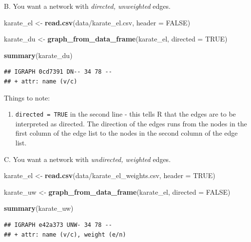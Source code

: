 \documentclass[
]{book}
\newenvironment{Shaded}{\begin{snugshade}}{\end{snugshade}}
\newcommand{\AttributeTok}[1]{\textcolor[rgb]{0.13,0.29,0.53}{#1}}
\newcommand{\ConstantTok}[1]{\textcolor[rgb]{0.56,0.35,0.01}{#1}}
\newcommand{\FunctionTok}[1]{\textcolor[rgb]{0.13,0.29,0.53}{\textbf{#1}}}
\newcommand{\NormalTok}[1]{#1}
\newcommand{\OtherTok}[1]{\textcolor[rgb]{0.56,0.35,0.01}{#1}}
\newcommand{\StringTok}[1]{\textcolor[rgb]{0.31,0.60,0.02}{#1}}
\providecommand{\tightlist}{%
  \setlength{\itemsep}{0pt}\setlength{\parskip}{0pt}}
\begin{document}
B. You want a network with \emph{directed, unweighted} edges.

\begin{Shaded}
\begin{Highlighting}[]
\NormalTok{karate\_el }\OtherTok{\textless{}{-}} \FunctionTok{read.csv}\NormalTok{(}\StringTok{\textquotesingle{}data/karate\_el.csv\textquotesingle{}}\NormalTok{, }\AttributeTok{header =} \ConstantTok{FALSE}\NormalTok{)}

\NormalTok{karate\_du }\OtherTok{\textless{}{-}} \FunctionTok{graph\_from\_data\_frame}\NormalTok{(karate\_el, }\AttributeTok{directed =} \ConstantTok{TRUE}\NormalTok{)}

\FunctionTok{summary}\NormalTok{(karate\_du)}
\end{Highlighting}
\end{Shaded}

\begin{verbatim}
## IGRAPH 0cd7391 DN-- 34 78 -- 
## + attr: name (v/c)
\end{verbatim}

Things to note:

\begin{enumerate}
\def\labelenumi{\arabic{enumi}.}
\tightlist
\item
  \texttt{directed\ =\ TRUE} in the second line - this tells R that the edges are to be interpreted as directed. The direction of the edges runs from the nodes in the first column of the edge list to the nodes in the second column of the edge list.
\end{enumerate}

C. You want a network with \emph{undirected, weighted} edges.

\begin{Shaded}
\begin{Highlighting}[]
\NormalTok{karate\_el }\OtherTok{\textless{}{-}} \FunctionTok{read.csv}\NormalTok{(}\StringTok{\textquotesingle{}data/karate\_el\_weights.csv\textquotesingle{}}\NormalTok{, }\AttributeTok{header =} \ConstantTok{TRUE}\NormalTok{)}

\NormalTok{karate\_uw }\OtherTok{\textless{}{-}} \FunctionTok{graph\_from\_data\_frame}\NormalTok{(karate\_el, }\AttributeTok{directed =} \ConstantTok{FALSE}\NormalTok{)}

\FunctionTok{summary}\NormalTok{(karate\_uw)}
\end{Highlighting}
\end{Shaded}

\begin{verbatim}
## IGRAPH e42a373 UNW- 34 78 -- 
## + attr: name (v/c), weight (e/n)
\end{verbatim}
\end{document}
